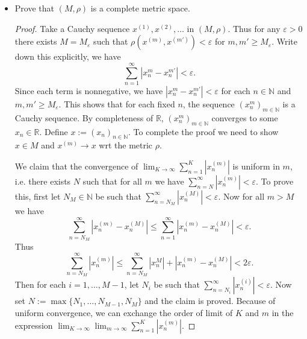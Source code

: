 \begin{itemize}
\begin{proof}
\begin{itemize}
			\item (triangle inequality) We note that $\rho(x,y) + \rho(y,z) = \sum_{n=1}^{\infty} \left| x_n - y_n \right| +\left| y_n - z_n \right| \ge  \sum_{n=q}^{\infty} \left| x_n - z_n \right| = \rho(x,z)$.
		\end{itemize}
		All properties are satisfied, so $\rho$ is a metric on $M$.
	\end{proof}
\item Prove that $(M, \rho)$ is a complete metric space.
	\begin{proof}
	Take a Cauchy sequence $x^{(1)}, x^{(2)},\ldots$ in $(M, \rho)$. Thus for any $\varepsilon>0$ there exists $M = M_\varepsilon$ such that $\rho(x^{(m)}, x^{(m')}) < \varepsilon$ for $m, m' \ge  M_\varepsilon$. Write down this explicitly, we have
	\[
		\sum_{n=1}^{\infty} \left|x^{m}_n - x^{m'}_n  \right|  < \varepsilon
	.\] 
	Since each term is nonnegative, we have $\left| x^{m}_n - x^{m'}_n \right| <\varepsilon$ for each $n \in \mathbb{N}$ and $m, m' \ge  M_\varepsilon$.
	This shows that for each fixed $n$, the sequence $\left( x^{m}_n \right)_{m \in \mathbb{N}} $ is a Cauchy sequence. By completeness of $\mathbb{R}$, $\left( x^{m}_n \right)_{m \in \mathbb{N}} $ converges to some $x_n \in \mathbb{R}$. Define $x := (x_n)_{n \in \mathbb{N}}$. To complete the proof we need to show $x \in M$ and $x^{(m)}\to x$ wrt the metric $\rho$.

	We claim that the convergence of $\lim_{K \to \infty} \sum_{n=1}^{K} \left| x^{(m)}_n \right| $ is uniform in $m$, i.e. there exists $N$ such that for all $m$ we have $\sum_{n=N}^{\infty} \left| x^{(m)}_n \right| <\varepsilon$. To prove this, first let $N_M \in \mathbb{N}$ be such that $\sum_{n=N_M}^{\infty} \left| x^{(M)}_n \right|<\varepsilon $. Now for all $m > M$ we have 
	\[
		\sum_{n=N_M}^{\infty} \left| x^{(m)}_n - x^{(M)}_n \right|\le \sum_{n=1}^{\infty} \left| x^{(m)}_n - x^{(M)}_n \right| < \varepsilon
	.\] 
	Thus
	\[
		\sum_{n=N_M}^{\infty} \left| x^{(m)}_n \right| \le \sum_{n=N_M}^{\infty} \left| x^{M}_n \right| +\left| x^{(m)}_n - x^{(M)}_n \right| < 2\varepsilon
	.\] 
	Then for each $i = 1,\ldots, M -1$, let $N_i$ be such that $\sum_{n=N_i}^{\infty} \left| x^{(i)}_n \right| <\varepsilon$. Now set $N := \max\{N_1, \ldots, N_{M-1 }, N_M\}$ and the claim is proved.
	Because of uniform convergence, we can exchange the order of limit of $K$ and $m$ in the expression $\lim_{K \to \infty} \lim_{m \to \infty} \sum_{n=1}^{K} |x^{(m)}_n|$.



\end{proof}
\end{itemize}
